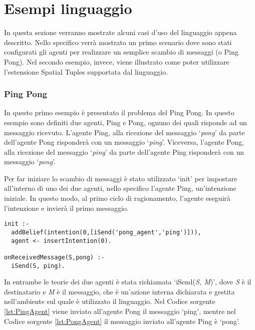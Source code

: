 \section{Esempi linguaggio}
In questa sezione verranno mostrate alcuni casi d'uso del linguaggio appena descritto. Nello specifico verr\`a mostrato un primo scenario dove sono stati configurati gli agenti per realizzare un semplice scambio di messaggi (o Ping Pong). Nel secondo esempio, invece, viene illustrato come poter utilizzare l'estensione Spatial Tuples supportata dal linguaggio.

\subsubsection{Ping Pong}
In questo primo esempio \`e presentato il problema del Ping Pong. In questo esempio sono definiti due agenti, Ping e Pong, ognuno dei quali risponde ad un messaggio ricevuto. L'agente Ping, alla ricezione del messaggio `\textit{pong}' da parte dell'agente Pong risponder\`a con un messaggio `\textit{ping}'. Viceversa, l'agente Pong, alla ricezione del messaggio `\textit{ping}' da parte dell'agente Ping risponder\`a con un messaggio `\textit{pong}'.

Per far iniziare lo scambio di messaggi \`e stato utilizzato `init' per impostare all'interno di uno dei due agenti, nello specifico l'agente Ping, un'intenzione iniziale. In questo modo, al primo ciclo di ragionamento, l'agente eseguir\`a l'intenzione e invier\`a il primo messaggio.
\lstset{
  basicstyle=\ttfamily,
  captionpos=b,
  frame=tb,
}
\medskip
\begin{lstlisting}[firstnumber=1,label={lst:PingAgent},caption={Agente Ping}]
init :-
  addBelief(intention(0,[iSend('pong_agent','ping')])),
  agent <- insertIntention(0).

onReceivedMessage(S,pong) :-
  iSend(S, ping).
\end{lstlisting}

In entrambe le teorie dei due agenti \`e stata richiamata `iSend(\textit{S, M})', dove \textit{S} \`e il destinatario e \textit{M} \`e il messaggio, che \`e un'azione interna dichiarata e gestita nell'ambiente sul quale \`e utilizzato il linguaggio. Nel Codice sorgente \ref{lst:PingAgent} viene inviato all'agente Pong il messaggio `ping', mentre nel Codice sorgente \ref{lst:PongAgent} il messaggio inviato all'agente Ping \`e `pong'.

